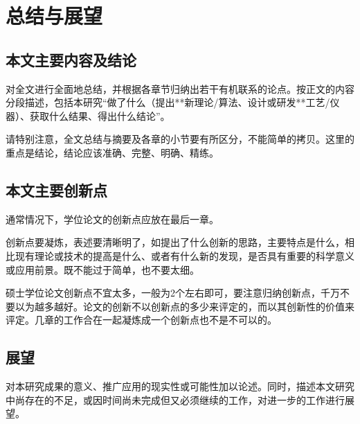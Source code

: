 
\chapter{总结与展望}
\label{cha:conclusion}

\section{本文主要内容及结论}
\label{sec:conclusion}
对全文进行全面地总结，并根据各章节归纳出若干有机联系的论点。按正文的内容分段描述，包括本研究“做了什么（提出**新理论/算法、设计或研发**工艺/仪器）、获取什么结果、得出什么结论”。

请特别注意，全文总结与摘要及各章的小节要有所区分，不能简单的拷贝。这里的重点是结论，结论应该准确、完整、明确、精练。


\section{本文主要创新点}
\label{sec:conclusion}
通常情况下，学位论文的创新点应放在最后一章。

创新点要凝炼，表述要清晰明了，如提出了什么创新的思路，主要特点是什么，相比现有理论或技术的提高是什么、或者有什么新的发现，是否具有重要的科学意义或应用前景。既不能过于简单，也不要太细。

硕士学位论文创新点不宜太多，一般为2个左右即可，要注意归纳创新点，千万不要以为越多越好。论文的创新不以创新点的多少来评定的，而以其创新性的价值来评定。几章的工作合在一起凝炼成一个创新点也不是不可以的。


\section{展望}
\label{sec:conclusion}
对本研究成果的意义、推广应用的现实性或可能性加以论述。同时，描述本文研究中尚存在的不足，或因时间尚未完成但又必须继续的工作，对进一步的工作进行展望。